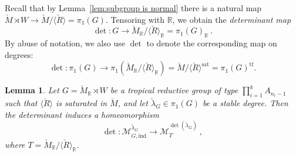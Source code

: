 \documentclass[10pt, a4paper]{amsart}
\newtheorem{lemma}[theorem]{Lemma}
\theoremstyle{definition}
\theoremstyle{myitemstyle}
\newcommand{\R}{\mathbb{R}}
\newcommand{\RR}{\mathbb{R}}
\newcommand{\Mcheck}{{\check{M}}}
\newcommand{\lambdacheck}{\check{\lambda}}
\newcommand{\Rcheck}{\check{R}}
\newcommand{\mc}[1]{{\mathcal{#1}}}
\newcommand{\sat}{\mathrm{sat}}
\newcommand{\ind}{\mathrm{ind}}
\begin{document}
Recall that by Lemma~\ref{lem:subgroup is normal} there is a natural map $\Mcheck\rtimes W\to \Mcheck/\langle \Rcheck\rangle=\pi_1(G)$. Tensoring with $\RR$, we obtain the \emph{determinant map}
\[
\det:G\longrightarrow \Mcheck_{\RR}/\langle\Rcheck\rangle_{\RR}=\pi_1(G)_{\RR} \ .
\]
By abuse of notation, we also use $\det$ to denote the corresponding map on degrees:
\[
\det:\pi_1(G)\longrightarrow \pi_1(\Mcheck_{\RR}/\langle\Rcheck\rangle_{\RR})=\Mcheck/\langle\Rcheck\rangle^{\sat}=\pi_1(G)^{\mathrm{tf}}.
\]
\begin{lemma}
\label{lem:determinant is isomorphism if roots are saturated}
Let $G=\Mcheck_\R \rtimes W$ be a tropical reductive group of type $\prod_{i=1}^k A_{n_i-1}$ such that $\langle\Rcheck\rangle$ is saturated in $\Mcheck$, and let $\lambdacheck_G\in \pi_1(G)$ be a stable degree. Then the determinant induces a homeomorphism
\[
    \det\colon \mc M^{\lambdacheck_G}_{G,\ind}\longrightarrow \mc M^{\det(\lambdacheck_G)}_{T} \ ,
\]
where $T=\Mcheck_{\RR}/\langle \Rcheck\rangle_{\RR}$.
\end{lemma}
\end{document}
